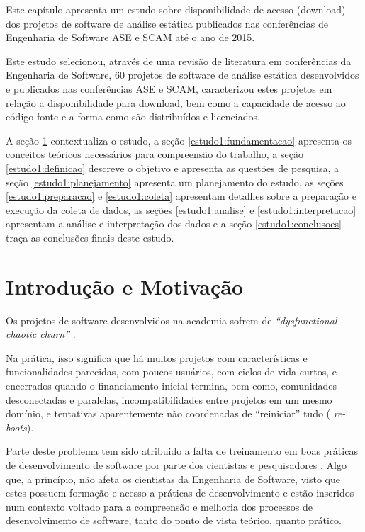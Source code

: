 {Este capítulo apresenta um estudo sobre disponibilidade de acesso (download)
dos projetos de software de análise estática publicados nas conferências de
Engenharia de Software ASE e SCAM até o ano de 2015.}

Este estudo selecionou, através de uma revisão de literatura em conferências da
Engenharia de Software, 60 projetos de software de análise estática
desenvolvidos e publicados nas conferências ASE e SCAM, caracterizou estes
projetos em relação a disponibilidade para download, bem como a capacidade de
acesso ao código fonte e a forma como são distribuídos e licenciados.

A seção \ref{estudo1:introducao} contextualiza o estudo,
a seção \ref{estudo1:fundamentacao} apresenta os conceitos teóricos necessários para compreensão do trabalho,
a seção \ref{estudo1:definicao} descreve o objetivo e apresenta as questões de pesquisa,
a seção \ref{estudo1:planejamento} apresenta um planejamento do estudo,
as seções \ref{estudo1:preparacao} e \ref{estudo1:coleta} apresentam detalhes sobre a preparação e execução da coleta de dados,
as seções \ref{estudo1:analise} e \ref{estudo1:interpretacao} apresentam a análise e interpretação dos dados e
a seção \ref{estudo1:conclusoes} traça as conclusões finais deste estudo.

\section{Introdução e Motivação} \label{estudo1:introducao} %

Os projetos de software desenvolvidos na academia sofrem de {\it
``dysfunctional chaotic churn''} \cite{howison2015understanding}.

Na prática, isso significa que há muitos projetos com características e
funcionalidades parecidas, com poucos usuários, com ciclos de vida curtos, e
encerrados quando o financiamento inicial termina, bem como, comunidades
desconectadas e paralelas, incompatibilidades entre projetos em um mesmo
domínio, e tentativas aparentemente não coordenadas de ``reiniciar'' tudo ({\it
re-boots}).

Parte deste problema tem sido atribuido a falta de treinamento em boas práticas
de desenvolvimento de software por parte dos cientistas e pesquisadores
\cite{wilson2017good}. Algo que, a princípio, não afeta os cientistas da
Engenharia de Software, visto que estes possuem formação e acesso a práticas de
desenvolvimento e estão inseridos num contexto voltado para a compreensão e
melhoria dos processos de desenvolvimento de software, tanto do ponto de vista
teórico, quanto prático.

